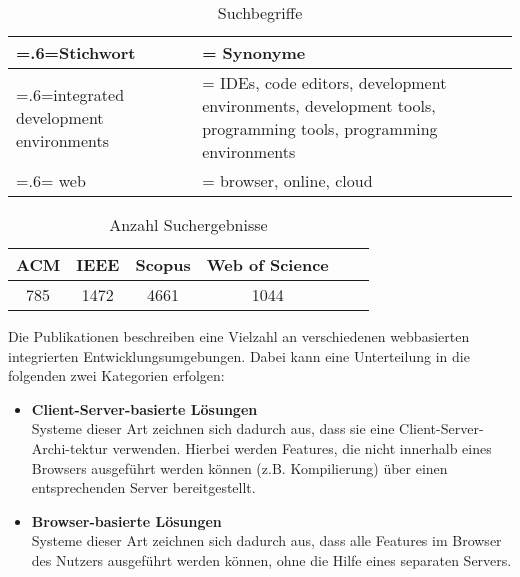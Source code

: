 \begin{table}[tbp]
    \centering
    \begin{tabularx}{\textwidth}{| >{\hsize=.6\hsize\linewidth=\hsize}X |
            >{\hsize=1.4\hsize\linewidth=\hsize}X |}
        \hline
        Stichwort                           & Synonyme                                                                                                     \\
        \hline
        integrated development environments & IDEs, code editors, development environments, development tools, programming tools, programming environments \\
        \hline
        web                                 & browser, online, cloud                                                                                       \\
        \hline
    \end{tabularx}
    \caption{Suchbegriffe}
    \label{table:search-terms}
\end{table}


\begin{table}[tbp]
    \centering
    \begin{tabular}{|c|c|c|c|c|c|}
        \hline
        ACM & IEEE & Scopus & Web of Science \\
        \hline
        785 & 1472 & 4661   & 1044           \\
        \hline
    \end{tabular}
    \caption{Anzahl Suchergebnisse}
    \label{table:amount-search-results}
\end{table}

Die Publikationen beschreiben eine Vielzahl an verschiedenen webbasierten integrierten Entwicklungsumgebungen. Dabei kann eine Unterteilung in die folgenden zwei Kategorien erfolgen:

\begin{itemize}
    \item \textbf{Client-Server-basierte Lösungen} \\
          Systeme dieser Art zeichnen sich dadurch aus, dass sie eine Client-Server-Archi-tektur verwenden. Hierbei werden Features, die nicht innerhalb eines Browsers ausgeführt werden können (z.B. Kompilierung) über einen entsprechenden Server bereitgestellt.
    \item \textbf{Browser-basierte Lösungen} \\
          Systeme dieser Art zeichnen sich dadurch aus, dass alle Features im Browser des Nutzers ausgeführt werden können, ohne die Hilfe eines separaten Servers.
\end{itemize}

